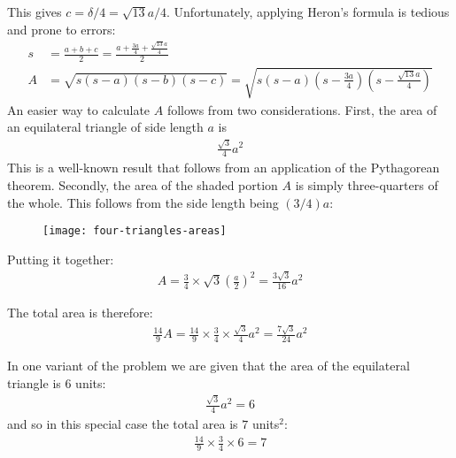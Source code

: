 This gives $c=\delta/4=\sqrt{13}a/4$. Unfortunately, applying Heron's formula is tedious and prone to errors: 
\begin{align*}
s & = \frac{a+b+c}{2}
    = \frac{a + \frac{3a}{4} + \frac{\sqrt{13}a}{4}}{2} \\
A & = \sqrt{s(s-a)(s-b)(s-c)}
    = \sqrt{s\left(s-a\right)\left(s-\frac{3a}{4}\right)\left(s-\frac{\sqrt{13}a}{4}\right)}
\end{align*}
An easier way to calculate $A$ follows from two considerations. First, the area of an equilateral triangle of side length $a$ is 
\begin{align*}
\frac{\sqrt{3}}{4} a^2
\end{align*}
This is a well-known result that follows from an application of the Pythagorean theorem. Secondly, the area of the shaded portion $A$ is simply three-quarters of the whole. This follows from the side length being $(3/4)a$: 
\begin{figure}[H]
\centering
\texttt{[image: four-triangles-areas]}
\end{figure}
Putting it together:
\begin{align*}
A = \frac{3}{4} \times \sqrt{3}\left(\frac{a}{2}\right)^2
  = \frac{3\sqrt{3}}{16} a^2
\end{align*}

The total area is therefore:
\begin{align*}
\frac{14}{9}  A 
  = \frac{14}{9} \times \frac{3}{4} \times \frac{\sqrt{3}}{4} a^2
  = \frac{7\sqrt{3}}{24} a^2
\end{align*}

In one variant of the problem we are given that the area of the equilateral triangle is $6$ units:
\begin{align*}
\frac{\sqrt{3}}{4} a^2 = 6
\end{align*} 
and so in this special case the total area is $7$ units$^2$: 
\begin{align*}
\frac{14}{9} \times \frac{3}{4} \times 6
  = 7
\end{align*}
